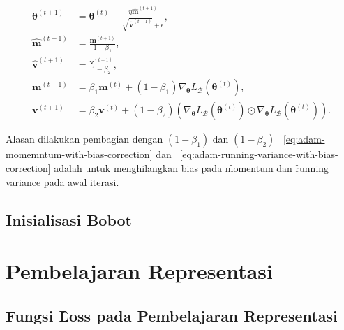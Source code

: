\begin{align}
    \label{eq:adam}
    \bm{\theta}^{(t+1)} &= \bm{\theta}^{(t)} - \frac{\eta \hat{\mathbf{m}}^{(t+1)}}{\sqrt{\hat{\mathbf{v}}^{(t+1)}} + \epsilon}, \\
    \label{eq:adam-momemntum-with-bias-correction}
    \hat{\mathbf{m}}^{(t+1)} &= \frac{\mathbf{m}^{(t+1)}}{1 - \beta_1}, \\
    \label{eq:adam-running-variance-with-bias-correction}
    \hat{\mathbf{v}}^{(t+1)} &= \frac{\mathbf{v}^{(t+1)}}{1 - \beta_2}, \\
    \mathbf{m}^{(t+1)} &= \beta_1 \mathbf{m}^{(t)} + (1 - \beta_1) \nabla_{\bm{\theta}} L_{\mathcal{B}}(\bm{\theta}^{(t)}), \\
    \mathbf{v}^{(t+1)} &= \beta_2 \mathbf{v}^{(t)} + (1 - \beta_2) \left(\nabla_{\bm{\theta}} L_{\mathcal{B}}(\bm{\theta}^{(t)})\odot \nabla_{\bm{\theta}} L_{\mathcal{B}}(\bm{\theta}^{(t)})\right).
\end{align}

Alasan dilakukan pembagian dengan $(1-\beta_1)$ dan $(1-\beta_2)$ \equ~\ref{eq:adam-momemntum-with-bias-correction} dan \equ~\ref{eq:adam-running-variance-with-bias-correction} adalah untuk menghilangkan bias pada \f{momentum} dan \f{running variance} pada awal iterasi.

\subsection{Inisialisasi Bobot}
    \label{sec:kaiminginit}

\section{Pembelajaran Representasi}

    \subsection{Fungsi \f{Loss} pada Pembelajaran Representasi}













        

